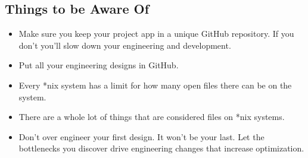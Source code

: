 \documentclass[12pt]{amsart}
\begin{document}
	\subsection{Things to be Aware Of}
	\begin{itemize}
		\item Make sure you keep your project app in a unique GitHub repository. If you don't you'll slow down your engineering and development.
		\item Put all your engineering designs in GitHub.
		\item Every *nix system has a limit for how many open files there can be on the system.
		\item There are a whole lot of things that are considered files on *nix systems.
		\item Don't over engineer your first design. It won't be your last. Let the bottlenecks you discover drive engineering changes that increase optimization.
	\end{itemize}
\end{document}

